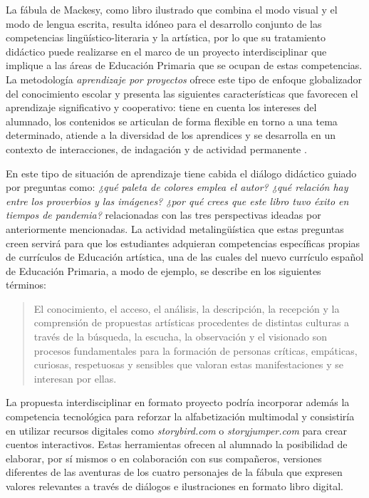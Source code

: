 \documentclass[spanish]{textolivre}
\begin{document}
La fábula de Mackesy, como libro ilustrado que combina el modo visual y el modo de lengua escrita, resulta idóneo para el desarrollo conjunto de las competencias lingüístico-literaria y la artística, por lo que su tratamiento didáctico puede realizarse en el marco de un proyecto interdisciplinar que implique a las áreas de Educación Primaria que se ocupan de estas competencias. La metodología \textit{aprendizaje por proyectos} ofrece este tipo de enfoque globalizador del conocimiento escolar y presenta las siguientes características que favorecen el aprendizaje significativo y cooperativo: tiene en cuenta los intereses del alumnado, los contenidos se articulan de forma flexible en torno a una tema determinado, atiende a la diversidad de los aprendices y se desarrolla en un contexto de interacciones, de indagación y de actividad permanente \cite{dominguez_chillon_proyectos_2003,merida_serrano_aprender_2011}.

En este tipo de situación de aprendizaje tiene cabida el diálogo didáctico guiado por preguntas como: \textit{¿qué paleta de colores emplea el autor? ¿qué relación hay entre los proverbios y las imágenes? ¿por qué crees que este libro tuvo éxito en tiempos de pandemia?} relacionadas con las tres perspectivas ideadas por \textcite{serafini_multimodal_2015} anteriormente mencionadas. La actividad metalingüística que estas preguntas creen servirá para que los estudiantes adquieran competencias específicas propias de currículos de Educación artística, una de las cuales del nuevo currículo español de Educación Primaria, a modo de ejemplo, se describe en los siguientes términos:

\begin{quote}
    El conocimiento, el acceso, el análisis, la descripción, la recepción y la comprensión de propuestas artísticas procedentes de distintas culturas a través de la búsqueda, la escucha, la observación y el visionado son procesos fundamentales para la formación de personas críticas, empáticas, curiosas, respetuosas y sensibles que valoran estas manifestaciones y se interesan por ellas. \cite[p. 3]{currriculo_de_educacion_artistica_competencias_2022}
\end{quote}

La propuesta interdisciplinar en formato proyecto podría incorporar además la competencia tecnológica para reforzar la alfabetización multimodal y consistiría en utilizar recursos digitales como \textit{storybird.com} o \textit{storyjumper.com} para crear cuentos interactivos. Estas herramientas ofrecen al alumnado la posibilidad de elaborar, por sí mismos o en colaboración con sus compañeros, versiones diferentes de las aventuras de los cuatro personajes de la fábula que expresen valores relevantes a través de diálogos e ilustraciones en formato libro digital.
\end{document}
